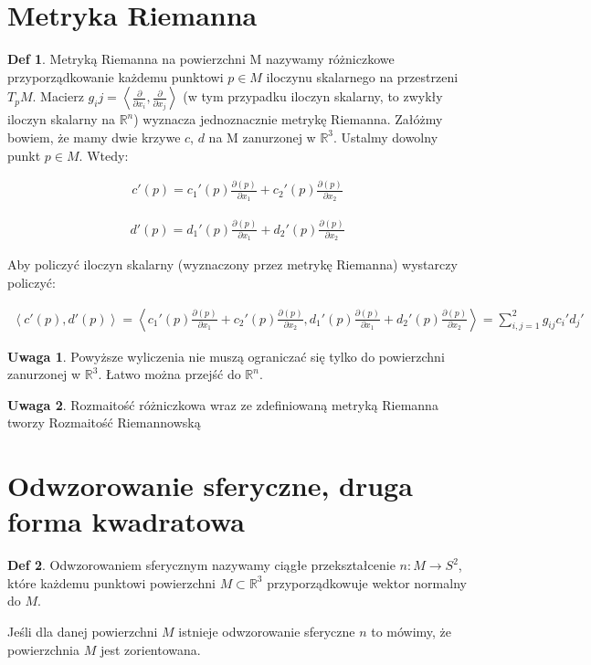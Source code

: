 \documentclass{article}
\theoremstyle{plain}
\theoremstyle{definition}
\newtheorem*{defi*}{Def}
\theoremstyle{definition}
\newtheorem*{not*}{Uwaga}
\begin{document}
\section{Metryka Riemanna}
\begin{defi*}
Metryką Riemanna na powierzchni M nazywamy różniczkowe przyporządkowanie każdemu punktowi $p \in M$ iloczynu skalarnego na przestrzeni $T_pM$. Macierz $g_ij = \left< \frac{\partial}{\partial x_i}, \frac{\partial}{\partial x_j} \right>$ (w tym przypadku iloczyn skalarny, to zwykły iloczyn skalarny na $\mathbb{R}^n$) wyznacza jednoznacznie metrykę Riemanna. Załóżmy bowiem, że mamy dwie krzywe $c$, $d$ na M zanurzonej w $\mathbb{R}^3$. Ustalmy dowolny punkt $p \in M$. Wtedy:

\begin{align*}
    c'(p) = c_1'(p)\frac{\partial (p)}{\partial x_1} + c_2'(p)\frac{\partial (p)}{\partial x_2}
\end{align*}

\begin{align*}
    d'(p) = d_1'(p)\frac{\partial (p)}{\partial x_1} + d_2'(p)\frac{\partial (p)}{\partial x_2}
\end{align*}

\noindent Aby policzyć iloczyn skalarny (wyznaczony przez metrykę Riemanna) wystarczy policzyć:

\begin{align*}
    \left< c'(p), d'(p) \right> = \left<  c_1'(p)\frac{\partial (p)}{\partial x_1} + c_2'(p)\frac{\partial (p)}{\partial x_2}, d_1'(p)\frac{\partial (p)}{\partial x_1} + d_2'(p)\frac{\partial (p)}{\partial x_2} \right> = \sum_{i,j=1}^2 g_{ij}c_i'd_j'
\end{align*}

\begin{not*}
Powyższe wyliczenia nie muszą ograniczać się tylko do powierzchni zanurzonej w $\mathbb{R}^3$. Łatwo można przejść do $\mathbb{R}^n$.
\end{not*}

\begin{not*}
Rozmaitość różniczkowa wraz ze zdefiniowaną metryką Riemanna tworzy Rozmaitość Riemannowską
\end{not*}




\end{defi*}

\section{Odwzorowanie sferyczne, druga forma kwadratowa}
\begin{defi*}
Odwzorowaniem sferycznym nazywamy ciągłe przekształcenie $n: M \to S^2$, które każdemu punktowi powierzchni $M \subset \mathbb{R}^3$ przyporządkowuje wektor normalny do $M$.
\end{defi*}
\noindent Jeśli dla danej powierzchni $M$ istnieje odwzorowanie sferyczne $n$ to mówimy, że powierzchnia $M$ jest zorientowana.
\end{document}
